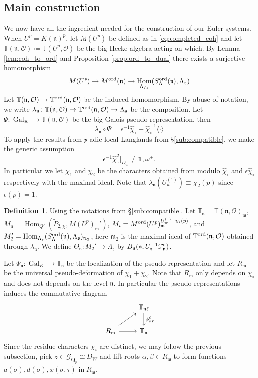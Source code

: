\documentclass[leqno]{amsart}
\theoremstyle{definition}
\newtheorem{defn}[thm]{Definition}
\theoremstyle{remark}
\newcommand{\id}{\mathbf{1}}
\newcommand{\oo}{\mathcal{O}}
\newcommand{\Qp}{\mathbf{Q}_p}
\DeclareMathOperator{\Hom}{Hom}
\DeclareMathOperator{\Gal}{Gal}
\newcommand{\fs}{\mathfrak{s}}
\newcommand{\fm}{\mathfrak{m}}
\newcommand{\fn}{\mathfrak{n}}
\newcommand{\Gp}{\mathcal{G}_{\Qp}} %
\newcommand{\K}{{\mathbf{K}}} %
\newcommand{\TT}{\mathbb{T}} %
\newcommand{\euF}{\EuScript{F}} %
\newcommand{\ord}{\textnormal{ord}} %
\begin{document}
\subsection{Main construction}
We now have all the ingredient needed 
for the construction of our Euler systems.
When $U^p=K(\fn)^p$,
let $M(U^p)$ be defined as in \eqref{eq:completed_coh}
and let $\TT(\fn,\oo)\coloneqq \TT(U^p,\oo)$
be the big Hecke algebra acting on which.
By Lemma \ref{lem:coh_to_ord}
and Proposition \ref{prop:ord_to_dual}
there exists a surjective homomorphism
\[
	M(U^p)\to M^{\ord}(\fn)\to 
	\Hom_{\Lambda_{fs}}(S_\Lambda^{\ord}(\fn),\Lambda_\fs)
\]
Let $\TT(\fn,\oo)\to \TT^{\ord}(\fn,\oo)$
be the induced homomorphism.
By abuse of notation, we write 
$\lambda_{\fn}\colon \TT(\fn,\oo)\to \TT^{\ord}(\fn,\oo)\to
\Lambda_{\fs}$ be the composition.
Let $\Psi\colon \Gal_\K\to \TT(\fn,\oo)$ be the 
big Galois pseudo-representation, then
\[
	\lambda_{\fn}\circ \Psi=
	\epsilon^{-1}\hat{\chi}_\circ+
	\hat{\chi}_\circ^{-1}\langle\cdot\rangle
\]
To apply the results from $p$-adic local Langlands
from \S\ref{sub:compatible},
we make the generic assumption
\begin{equation}\label{cond:chi_gen}\tag{$\chi$-gen}
\epsilon^{-1}\hat{\chi}_\circ^{2}\vert_{D_w}\neq
\id, \omega^{\pm}.
\end{equation}
In particular we let 
$\chi_1$ and  $\chi_2$ be the 
characters obtained from 
modulo 
$\hat{\chi}_\circ$ and $\epsilon\hat{\chi}_\circ$ 
respectively with the maximal ideal.
Note that $\lambda_{\fn}(U_{w}^{(1)})\equiv \chi_2(p)$
since $\epsilon(p)=1$.


\begin{defn}
	Using the notations from 
	\S\ref{sub:compatible}.
	Let $\TT_\fn=\TT(\fn,\oo)_\fm$,
	$M_\fn=\Hom_{Q'}(\tilde{P}_{2,\chi},M(U^p)_{\fm}')$,
	$M_i=M^{\ord}(U^p)_\fm^{U_{w}^{(1)}\equiv\chi_i(p)}$,
	and $M_2'=\Hom_{\Lambda_{\fs}}
	(S^{\ord}_{\Lambda}(\fn),\Lambda_{\fs})_{\fm_2}$,
	here $\fm_2$ is the maximal ideal
	of $\TT^{\ord}(\fn,\oo)$ obtained through 
	$\lambda_\fn$.
	We define 
	$\Theta_\fn\colon M_2'\to \Lambda_{\fs}$
	by $B_\fn(*,U_\fs^{-1}\euF^\circ_\fn)$.
\end{defn}


Let $\Psi_{\fn}\colon \Gal_K\to \TT_\fn$ be the localization
of the pseudo-representation
and let $R_{\fm}$ be the universal 
pseudo-deformation of $\chi_1+\chi_2$.
Note that  $R_\fm$ only depends on  $\chi_\circ$
and does not depends on the level  $\fn$.
In particular the pseudo-representations induces
the commutative diagram
\[
\begin{tikzcd}
	& \TT_{\fn\ell}\arrow[d,"\phi_{\fn\ell}^\ell"]\\
	R_{\fm}\arrow[r]\arrow[ur]
	& \TT_{\fn}
\end{tikzcd}
\]
Since the residue characters $\chi_i$ are distinct,
we may follow the previous subsection,
pick  $z\in \Gp\cong D_W$ 
and lift roots $\alpha,\beta\in R_\fm$
to form functions  $a(\sigma), d(\sigma), x(\sigma,\tau)$
in  $R_\fm$.
\end{document}
